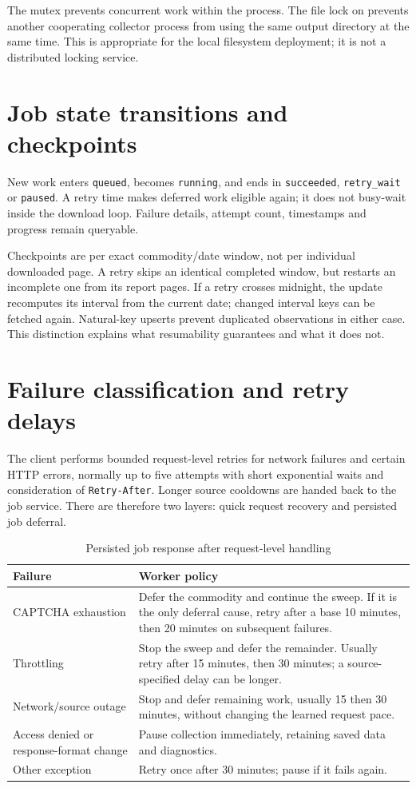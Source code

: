 \documentclass[12pt,a4paper,oneside]{report}
\numberwithin{equation}{chapter}
\numberwithin{figure}{chapter}
\numberwithin{table}{chapter}
\theoremstyle{definition}
\begin{document}
The mutex prevents concurrent work within the process. The file lock on  prevents another cooperating collector process from using the same output directory at the same time. This is appropriate for the local filesystem deployment; it is not a distributed locking service.

\section{Job state transitions and checkpoints}
New work enters \texttt{queued}, becomes \texttt{running}, and ends in \texttt{succeeded}, \texttt{retry\_wait} or \texttt{paused}. A retry time makes deferred work eligible again; it does not busy-wait inside the download loop. Failure details, attempt count, timestamps and progress remain queryable.

Checkpoints are per exact commodity/date window, not per individual downloaded page. A retry skips an identical completed window, but restarts an incomplete one from its report pages. If a retry crosses midnight, the update recomputes its interval from the current date; changed interval keys can be fetched again. Natural-key upserts prevent duplicated observations in either case. This distinction explains what resumability guarantees and what it does not.

\section{Failure classification and retry delays}
The client performs bounded request-level retries for network failures and certain HTTP errors, normally up to five attempts with short exponential waits and consideration of \texttt{Retry-After}. Longer source cooldowns are handed back to the job service. There are therefore two layers: quick request recovery and persisted job deferral.

\begin{table}[H]
\centering
\caption{Persisted job response after request-level handling}
\label{tab:retry}
\small
\begin{tabular}{@{}p{}p{}@{}}
\toprule
Failure & Worker policy \\
\midrule
CAPTCHA exhaustion & Defer the commodity and continue the sweep. If it is the only deferral cause, retry after a base 10 minutes, then 20 minutes on subsequent failures. \\
Throttling & Stop the sweep and defer the remainder. Usually retry after 15 minutes, then 30 minutes; a source-specified delay can be longer. \\
Network/source outage & Stop and defer remaining work, usually 15 then 30 minutes, without changing the learned request pace. \\
Access denied or response-format change & Pause collection immediately, retaining saved data and diagnostics. \\
Other exception & Retry once after 30 minutes; pause if it fails again. \\
\bottomrule
\end{tabular}
\end{table}
\end{document}

